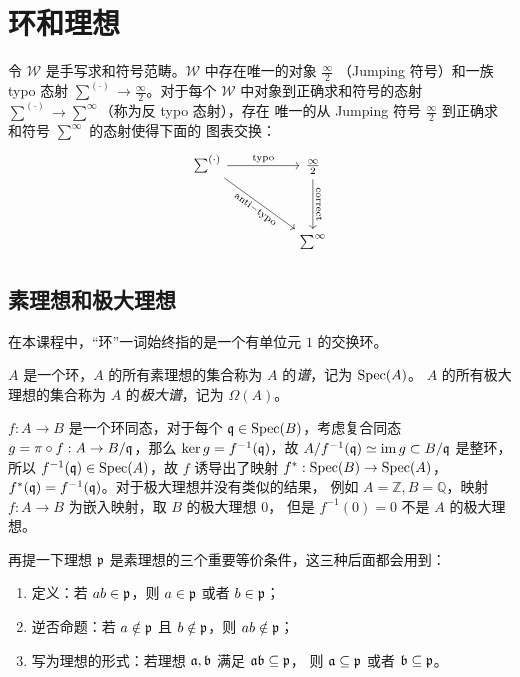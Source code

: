 \chapter{环和理想}

\begin{theorem}
  令 $\mathcal{W}$ 是手写求和符号范畴。$\mathcal{W}$ 中存在唯一的对象 $\frac{\infty}{2}$
  （Jumping 符号）和一族 typo 态射 $\sum^{(\cdot)}\to\frac{\infty}{2}$。对于每个 $\mathcal{W}$
  中对象到正确求和符号的态射 $\sum^{(\cdot)}\to\sum^\infty$（称为反 typo 态射），存在
  唯一的从 Jumping 符号 $\frac{\infty}{2}$ 到正确求和符号 $\sum^{\infty}$ 的态射使得下面的
  图表交换：
  \[
    \begin{tikzcd}[column sep=huge,row sep=huge]
      \sum^{(\cdot)} \arrow[dr,"\mathrm{anti-typo}"',sloped]\arrow[r,"\mathrm{typo}"]
      &
      \frac{\infty}{2} \arrow[d,"\mathrm{correct}",sloped] \\
      &
      \sum^{\infty}
    \end{tikzcd}
  \]
\end{theorem}

\section{素理想和极大理想}

在本课程中，“环”一词始终指的是一个有单位元 $1$ 的交换环。

\begin{definition}
  $A$ 是一个环，$A$ 的所有素理想的集合称为 $A$ 的\emph{谱}，记为 $\operatorname{Spec}(A)$。
  $A$ 的所有极大理想的集合称为 $A$ 的\emph{极大谱}，记为 $\Omega(A)$。
\end{definition}

$f:A\to B$ 是一个环同态，对于每个 $\mathfrak{q}\in\operatorname{Spec}(B)$，考虑复合同态
$g=\pi\circ f:A\to B/\mathfrak{q}$，那么 $\ker g=f^{-1}(\mathfrak{q})$，故
$A/f^{-1}(\mathfrak{q})\simeq \operatorname{im} g\subset B/\mathfrak{q}$ 是整环，所以
$f^{-1}(\mathfrak{q})\in\operatorname{Spec}(A)$，故 $f$ 诱导出了映射 $f^*:\operatorname{Spec}(B)\to\operatorname{Spec}(A)$，
$f^*(\mathfrak{q})=f^{-1}(\mathfrak{q})$。对于极大理想并没有类似的结果，
例如 $A=\mathbb{Z},B=\mathbb{Q}$，映射 $f:A\to B$ 为嵌入映射，取 $B$ 的极大理想 $0$，
但是 $f^{-1}(0)=0$ 不是 $A$ 的极大理想。

再提一下理想 $\mathfrak{p}$ 是素理想的三个重要等价条件，这三种后面都会用到：
\begin{enumerate}
  \item 定义：若 $ab\in\mathfrak{p}$，则 $a\in\mathfrak{p}$ 或者 $b\in\mathfrak{p}$；
  \item 逆否命题：若 $a\notin\mathfrak{p}$ 且 $b\notin\mathfrak{p}$，则 $ab\notin\mathfrak{p}$；
  \item 写为理想的形式：若理想 $\mathfrak{a},\mathfrak{b}$ 满足 $\mathfrak{a}\mathfrak{b}\subseteq\mathfrak{p}$，
  则 $\mathfrak{a}\subseteq\mathfrak{p}$ 或者 $\mathfrak{b}\subseteq\mathfrak{p}$。
\end{enumerate}

